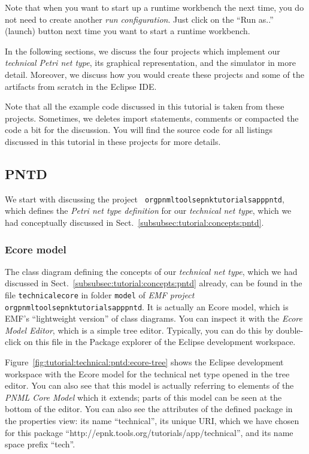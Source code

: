 Note that when you want to start up a runtime workbench the next time, you do
not need to create another \emph{run configuration}. Just click on the
``Run as..'' (launch) button next time you want to start a runtime workbench.
 
In the following sections, we discuss the four projects which implement
our \emph{technical Petri net type}, its graphical representation, and the
simulator in more detail. Moreover, we discuss how you would create these
projects and some of the artifacts from scratch in the Eclipse IDE.

Note that all the example code discussed in this tutorial is taken from these
projects. Sometimes, we deletes import statements, comments or compacted the
code a bit for the discussion. You will find the source code for all listings
discussed in this tutorial in these projects for more details.

\subsection{PNTD}
\label{sec:tutorial:technical:pntd}

We start with discussing the project {\tt
org\qnsep{}pnml\qnsep{}tools\qnsep{}epnk\qnsep{}tutorials\qnsep{}app\qnsep{}pntd},
which defines the \emph{Petri net type definition} for our \emph{technical net type},
which we had conceptually discussed in
Sect.~\ref{subsubsec:tutorial:concepts:pntd}.

\subsubsection{Ecore model}
\label{subsec:tutorial:technical:pntd:ecore}

The class diagram defining the concepts of our \emph{technical net type},
which we had discussed in Sect.~\ref{subsubsec:tutorial:concepts:pntd} already,
can be found in the file {\tt technical\qnsep{}ecore} in folder {\tt model} of
\emph{EMF project} {\tt
org\qnsep{}pnml\qnsep{}tools\qnsep{}epnk\qnsep{}tutorials\qnsep{}app\qnsep{}pntd}.
It is actually an Ecore model, which is EMF's ``lightweight version'' of class diagrams.
You can inspect it with the \emph{Ecore Model Editor}, which is a simple tree
editor. Typically, you can do this by double-click on this file in the Package
explorer of the Eclipse development workspace.

Figure~\ref{fig:tutorial:technical:pntd:ecore-tree} shows the Eclipse
development workspace with the Ecore model for the technical net type
opened in the tree editor. You can also see that this model is actually
referring to elements of the \emph{PNML Core Model} which it extends; parts of
this model can be seen at the bottom of the editor. You can also see the
attributes of the defined package in the properties view: its name
``technical'', its unique URI, which we have chosen for this package
``http://epnk.tools.org/tutorials/app/technical'', and its name space prefix
``tech''.

